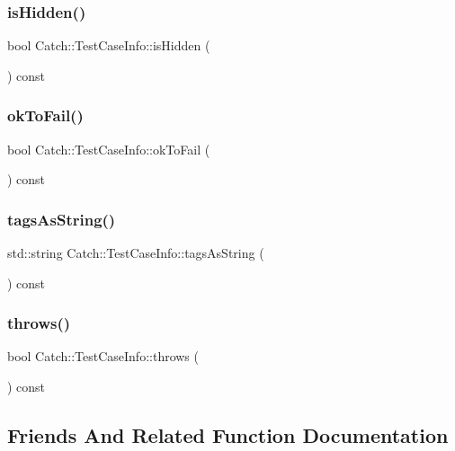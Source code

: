 \subsubsection{isHidden()}
{\footnotesize\ttfamily bool Catch\+::\+Test\+Case\+Info\+::is\+Hidden (\begin{DoxyParamCaption}{ }\end{DoxyParamCaption}) const}

\mbox{\label{struct_catch_1_1_test_case_info_a5f37291295e3a6de2dd85324c941edaf}} 
\subsubsection{okToFail()}
{\footnotesize\ttfamily bool Catch\+::\+Test\+Case\+Info\+::ok\+To\+Fail (\begin{DoxyParamCaption}{ }\end{DoxyParamCaption}) const}

\mbox{\label{struct_catch_1_1_test_case_info_a17506de67fb18e27511c17f8a81119d8}} 
\subsubsection{tagsAsString()}
{\footnotesize\ttfamily std\+::string Catch\+::\+Test\+Case\+Info\+::tags\+As\+String (\begin{DoxyParamCaption}{ }\end{DoxyParamCaption}) const}

\mbox{\label{struct_catch_1_1_test_case_info_afc70d4379a2070cc22b693ffe3932c1a}} 
\subsubsection{throws()}
{\footnotesize\ttfamily bool Catch\+::\+Test\+Case\+Info\+::throws (\begin{DoxyParamCaption}{ }\end{DoxyParamCaption}) const}



\subsection{Friends And Related Function Documentation}
\mbox{\label{struct_catch_1_1_test_case_info_a0fe44abaf18ae7c26f98a9fc2b08679c}} 
